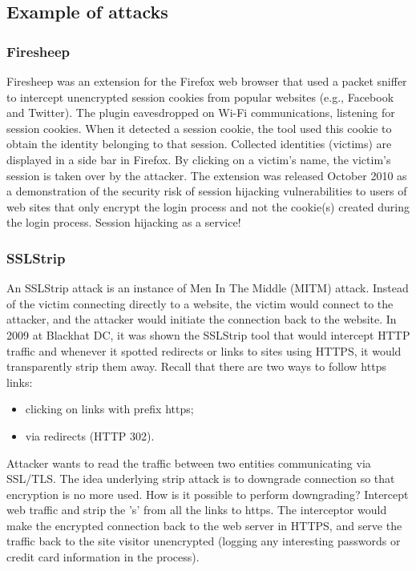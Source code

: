 \documentclass[a4paper, 10pt, titlepage]{article}
\begin{document}
\subsection{Example of attacks}
\subsubsection*{Firesheep}
Firesheep was an extension for the Firefox web browser that used a packet sniffer to intercept unencrypted session cookies from popular websites (e.g., Facebook and Twitter). The plugin eavesdropped on Wi-Fi communications, listening for session cookies. When it detected a session cookie, the tool used this cookie to obtain the identity belonging to that session. Collected identities (victims) are displayed in a side bar in Firefox. By clicking on a victim's name, the victim's session is taken over by the attacker. The extension was released October 2010 as a demonstration of the security risk of session hijacking vulnerabilities to users of web sites that only encrypt the login process and not the cookie(s) created during the login process. Session hijacking as a service!

\subsubsection{SSLStrip}
An SSLStrip attack is an instance of Men In The Middle (MITM) attack. Instead of the victim connecting directly to a website, the victim would connect to the attacker, and the attacker would initiate the connection back to the website.
In 2009 at Blackhat DC, it was shown the SSLStrip tool that would intercept HTTP traffic and whenever it spotted redirects or links to sites using HTTPS, it would transparently strip them away. Recall that there are two ways to follow https links:
\begin{itemize}
\item clicking on links with prefix https;
\item via redirects (HTTP 302).
\end{itemize} 
Attacker wants to read the traffic between two entities communicating via SSL/TLS. The idea underlying strip attack is to downgrade connection so that encryption is no more used. How is it possible to perform downgrading? Intercept web traffic and strip the 's' from all the links to https. The interceptor would make the encrypted connection back to the web server in HTTPS, and serve the traffic back to the site visitor unencrypted (logging any interesting passwords or credit card information in the process).
\end{document}
